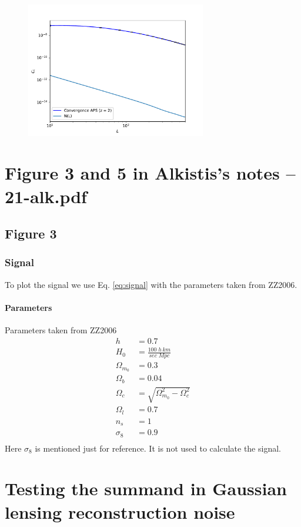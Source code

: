 \documentclass[12pt]{article}
\numberwithin{equation}{section}
\begin{document}
\begin{figure}
	\centering
	\includegraphics[width=0.7\textwidth]{full_plot_j_max_1_lmax_1000}
\end{figure}


\section{Figure 3 and 5 in Alkistis's notes -- 21-alk.pdf}
\subsection{Figure 3}
\subsubsection{Signal}
To plot the signal we use Eq. \ref{eq:signal} with the parameters taken from ZZ2006.

\paragraph{Parameters}
Parameters taken from ZZ2006
\begin{align}
h & = 0.7 \\
H_0 &= \frac{100\;h\,km}{sec\;Mpc}\\
\Omega_{m_0} &= 0.3 \\
\Omega_{b} &= 0.04 \\
\Omega_{c} &= \sqrt{\Omega_{m_0}^2 - \Omega_{c}^2}\\
\Omega_{l} &= 0.7\\
n_s &= 1\\
\sigma_8 &= 0.9\\
\end{align}
Here $\sigma_8$ is mentioned just for reference. It is not used to calculate the signal.


\section{Testing the summand in Gaussian lensing reconstruction noise}
\end{document}
